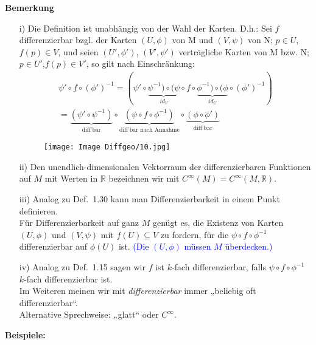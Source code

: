 \documentclass[fleqn, 12pt, letterpaper]{article}
\newcommand{\txt}[1]{\text{#1}}
\begin{document}
\textbf{Bemerkung}
\begin{itemize}
  \item[i)] Die Definition ist unabhängig von der Wahl der Karten. D.h.: Sei $f$ differenzierbar bzgl. der Karten $(U,\phi)$ von M und $(V,\psi)$ von N; $p\in U$,$f(p)\in V$,
  und seien $(U', \phi')$, $(V', \psi')$ verträgliche Karten von M bzw. N; $p\in U'$,$f(p)\in V'$, so gilt nach Einschränkung:
  \begin{align*}
    \psi' \circ f \circ (\phi')^{-1} = (\psi' \circ \underbrace{\psi^{-1}) \circ (\psi}_{id_V} \circ f \circ \underbrace{\phi^{-1}) \circ (\phi}_{id_U} \circ (\phi')^{-1})\\=\underbrace{(\psi'\circ\psi^{-1})}_{\txt{diff'bar}}\circ\underbrace{(\psi\circ f\circ\phi^{-1})}_{\txt{diff'bar nach Annahme}}\circ\underbrace{(\phi\circ\phi')}_{\txt{diff'bar}}
  \end{align*}
  \begin{figure}[H]
    \centering
    \texttt{[image: Image Diffgeo/10.jpg]}
  \end{figure}


  \item[ii)] Den unendlich-dimensionalen Vektorraum der differenzierbaren Funktionen auf $M$ mit Werten in $\mathbb{R}$ bezeichnen wir mit $C^\infty(M)=C^\infty(M, \mathbb{R})$.

  \item[iii)] Analog zu Def.\ 1.30 kann man Differenzierbarkeit in einem Punkt definieren.\\
  Für Differenzierbarkeit auf ganz $M$ genügt es, die Existenz von Karten $(U, \phi)$ und $(V, \psi)$ mit $f(U) \subseteq V$ zu fordern, für die $\psi \circ f \circ \phi^{-1}$ differenzierbar auf $\phi(U)$ ist.
  \textcolor{blue}{(Die $(U, \phi)$ müssen $M$ überdecken.)}

  \item[iv)] Analog zu Def.\ 1.15 sagen wir $f$ ist $k$-fach differenzierbar, falls $\psi \circ f \circ \phi^{-1}$ $k$-fach differenzierbar ist.\\
  Im Weiteren meinen wir mit \emph{differenzierbar} immer „beliebig oft differenzierbar“.\\
  Alternative Sprechweise: „glatt“ oder $C^\infty$.

\end{itemize}
\textbf{Beispiele:}
\end{document}
